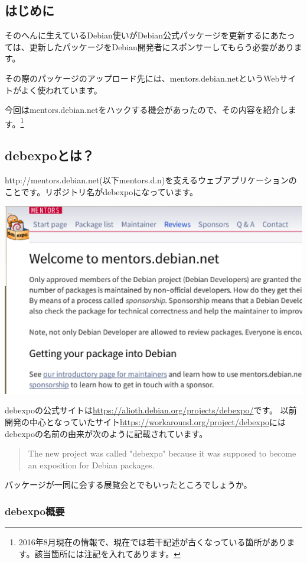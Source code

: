 \documentclass[mingoth,a4paper]{jsarticle}
\begin{document}
\subsection{はじめに}

そのへんに生えているDebian使いがDebian公式パッケージを更新するにあたっては、更新したパッケージをDebian開発者にスポンサーしてもらう必要があります。

その際のパッケージのアップロード先には、mentors.debian.netというWebサイトがよく使われています。

今回はmentors.debian.netをハックする機会があったので、その内容を紹介します。\footnote{2016年8月現在の情報で、現在では若干記述が古くなっている箇所があります。該当箇所には注記を入れてあります。}

\subsection{debexpoとは？}

http://mentors.debian.net(以下mentors.d.n)を支えるウェブアプリケーションのことです。リポジトリ名がdebexpoになっています。

\begin{center}
\includegraphics[width=0.5\hsize]{image201606/mentors.d.n.eps}
\end{center}

debexpoの公式サイトは\url{https://alioth.debian.org/projects/debexpo/}です。
以前開発の中心となっていたサイト\url{https://workaround.org/project/debexpo}にはdebexpoの名前の由来が次のように記載されています。

\begin{quotation}
The new project was called "debexpo" because it was supposed to become an {\color{red}expo}sition for {\color{red}Deb}ian packages.
\end{quotation}

パッケージが一同に会する展覧会とでもいったところでしょうか。

\subsubsection{debexpo概要}
\end{document}
